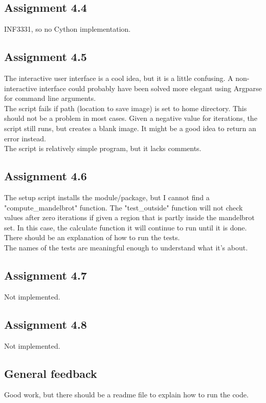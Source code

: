 \documentclass[a4paper]{article}
\begin{document}
\subsection*{Assignment 4.4}
INF3331, so no Cython implementation.\\

\subsection*{Assignment 4.5}
The interactive user interface is a cool idea, but it is a little confusing. A non-interactive interface could probably have been solved more elegant using Argparse for command line arguments.\\
The script fails if path (location to save image) is set to home directory. This should not be a problem in most cases. Given a negative value for iterations, the script still runs, but creates a blank image. It might be a good idea to return an error instead.\\
The script is relatively simple program, but it lacks comments.
\subsection*{Assignment 4.6}
The setup script installs the module/package, but I cannot find a "compute\_mandelbrot" function.
The "test\_outside" function will not check values after zero iterations if given a region that is partly inside the mandelbrot set. In this case, the calculate function it will continue to run until it is done.\\
There should be an explanation of how to run the tests. \\
The names of the tests are meaningful enough to understand what it's about.\\

\subsection*{Assignment 4.7}
Not implemented.

\subsection*{Assignment 4.8}
Not implemented.



\subsection*{General feedback}
Good work, but there should be a readme file to explain how to run the code.\\ 




\end{document}
